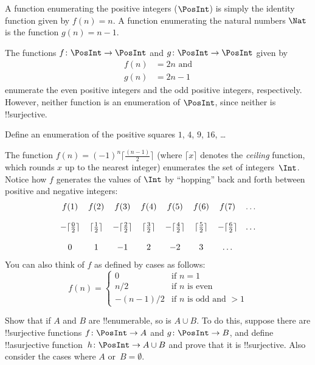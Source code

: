 \begin{ex}
A function enumerating the positive integers ($\PosInt$) is simply the
identity function given by $f(n) = n$. A function enumerating the
natural numbers $\Nat$ is the function $g(n) = n - 1$.
\end{ex}

\begin{ex}
The functions $f\colon \PosInt \to \PosInt$ and $g \colon \PosInt \to
\PosInt$ given by
\begin{align*}
f(n) & = 2n \text{ and}\\
g(n) & = 2n - 1
\end{align*}
enumerate the even positive integers and the odd positive integers,
respectively. However, neither function is an enumeration of
$\PosInt$, since neither is !!{surjective}.
\end{ex}

\begin{prob}
Define an enumeration of the positive squares $1$, $4$, $9$, $16$, \dots
\end{prob}

\begin{ex}
The function $f(n) = (-1)^{n} \lceil \frac{(n-1)}{2}\rceil$ (where
$\lceil x \rceil$ denotes the \emph{ceiling} function, which rounds
$x$ up to the nearest integer) enumerates the set of
integers~$\Int$. Notice how $f$ generates the values of $\Int$ by
``hopping'' back and forth between positive and negative integers:
\[
\begin{array}{c c c c c c c c}
f(1) & f(2) & f(3) & f(4) & f(5) & f(6) & f(7) & \dots \\ \\
- \lceil \tfrac{0}{2} \rceil & \lceil \tfrac{1}{2}\rceil & - \lceil \tfrac{2}{2} \rceil & \lceil \tfrac{3}{2} \rceil & - \lceil \tfrac{4}{2} \rceil  & \lceil \tfrac{5}{2}
\rceil & - \lceil \tfrac{6}{2} \rceil & \dots \\ \\
0 & 1 & -1 & 2 & -2 & 3 & \dots
\end{array}
\]
You can also think of $f$ as defined by cases as follows:
\[
f(n) = \begin{cases}
  0 & \text{if $n = 1$}\\
  n/2 & \text{if $n$ is even}\\
  -(n-1)/2 & \text{if $n$ is odd and $>1$}
  \end{cases}
\]
\end{ex}

\begin{prob}
  Show that if $A$ and $B$ are !!{enumerable}, so is $A \cup B$. To do
  this, suppose there are !!{surjective} functions $f\colon \PosInt \to
  A$ and $g\colon \PosInt \to B$, and define !!a{surjective}
  function~$h\colon \PosInt \to A \cup B$ and prove that it is
  !!{surjective}. Also consider the cases where $A$ or~$B = \emptyset$.
\end{prob}
  
